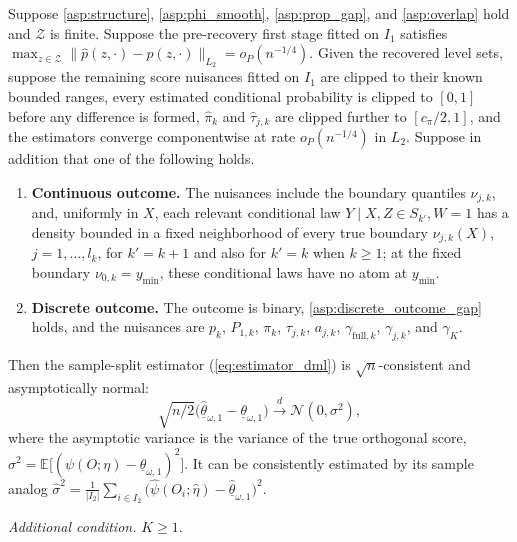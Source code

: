 \begin{theorem} \label{thm:dml_normality}
    Suppose \cref{asp:structure}, \cref{asp:phi_smooth}, \cref{asp:prop_gap}, and \cref{asp:overlap} hold and $\mathcal{Z}$ is finite. Suppose the pre-recovery first stage fitted on $I_1$ satisfies $\max_{z\in\mathcal Z}\|\hat p(z,\cdot)-p(z,\cdot)\|_{L_2}=o_P(n^{-1/4})$. Given the recovered level sets, suppose the remaining score nuisances fitted on $I_1$ are clipped to their known bounded ranges, every estimated conditional probability is clipped to $[0,1]$ before any difference is formed, $\hat\pi_k$ and $\hat\tau_{j,k}$ are clipped further to $[c_\pi/2,1]$, and the estimators converge componentwise at rate $o_P(n^{-1/4})$ in $L_2$. Suppose in addition that one of the following holds.
    \begin{enumerate}[label=\textup{(\roman*)}]
        \item \textbf{Continuous outcome.} The nuisances include the boundary quantiles $\nu_{j,k}$, and, uniformly in $X$, each relevant conditional law $Y\mid X,Z\in S_{k'},W=1$ has a density bounded in a fixed neighborhood of every true boundary $\nu_{j,k}(X)$, $j=1,\ldots,l_k$, for $k'=k+1$ and also for $k'=k$ when $k\geqslant1$; at the fixed boundary $\nu_{0,k}=y_{\min}$, these conditional laws have no atom at $y_{\min}$.
        \item \textbf{Discrete outcome.} The outcome is binary, \cref{asp:discrete_outcome_gap} holds, and the nuisances are $p_k$, $P_{1,k}$, $\pi_k$, $\tau_{j,k}$, $a_{j,k}$, $\gamma_{\mathrm{full},k}$, $\gamma_{j,k}$, and $\gamma_K$.
    \end{enumerate}
    Then the sample-split estimator (\ref{eq:estimator_dml}) is $\sqrt{n}$-consistent and asymptotically normal:
    \begin{equation*}
        \sqrt{n/2} \big( \hat{\underline{\theta}}_{\omega, 1} - \underline{\theta}_{\omega, 1} \big) \xrightarrow{d} \mathcal{N}(0, \sigma^2),
    \end{equation*}
    where the asymptotic variance is the variance of the true orthogonal score, $\sigma^2 = \mathbb{E}\big[ ({\psi}(O; \eta) - \underline{\theta}_{\omega, 1})^2 \big]$. It can be consistently estimated by its sample analog $\hat{\sigma}^2 = \frac{1}{|I_2|} \sum_{i \in I_2} \big(\hat{\psi}(O_i; \hat{\eta}) - \hat{\underline{\theta}}_{\omega, 1}\big)^2$.

\emph{Additional condition.} $K\geqslant1$.
\end{theorem}

